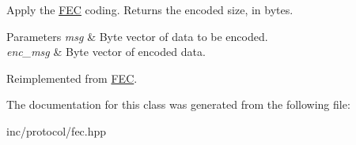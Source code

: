 Apply the \hyperlink{classFEC}{F\+EC} coding. Returns the encoded size, in bytes. 
\begin{DoxyParams}{Parameters}
{\em msg} & Byte vector of data to be encoded. \\
\hline
{\em enc\+\_\+msg} & Byte vector of encoded data. \\
\hline
\end{DoxyParams}


Reimplemented from \hyperlink{classFEC_abc86f45390c50b3cd90cade73a137355}{F\+EC}.



The documentation for this class was generated from the following file\+:\begin{DoxyCompactItemize}
\item 
inc/protocol/fec.\+hpp\end{DoxyCompactItemize}

